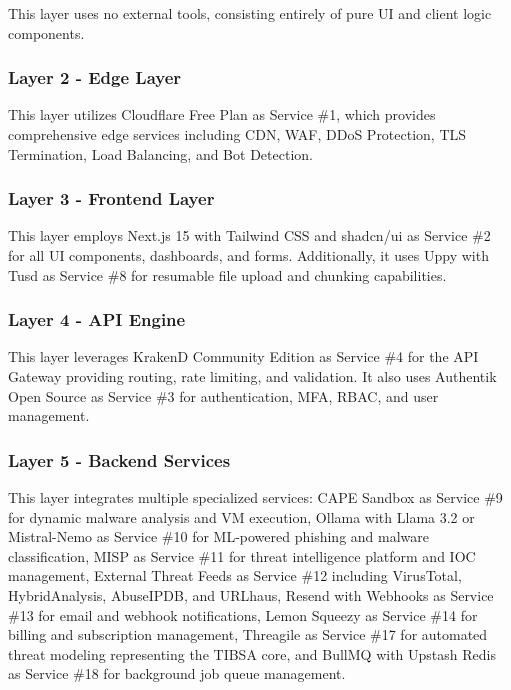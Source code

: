 \documentclass[12pt,a4paper]{report}
\begin{document}
This layer uses no external tools, consisting entirely of pure UI and client logic components.

\subsubsection{Layer 2 - Edge Layer}

This layer utilizes Cloudflare Free Plan as Service \#1, which provides comprehensive edge services including CDN, WAF, DDoS Protection, TLS Termination, Load Balancing, and Bot Detection.

\subsubsection{Layer 3 - Frontend Layer}

This layer employs Next.js 15 with Tailwind CSS and shadcn/ui as Service \#2 for all UI components, dashboards, and forms. Additionally, it uses Uppy with Tusd as Service \#8 for resumable file upload and chunking capabilities.

\subsubsection{Layer 4 - API Engine}

This layer leverages KrakenD Community Edition as Service \#4 for the API Gateway providing routing, rate limiting, and validation. It also uses Authentik Open Source as Service \#3 for authentication, MFA, RBAC, and user management.

\subsubsection{Layer 5 - Backend Services}

This layer integrates multiple specialized services: CAPE Sandbox as Service \#9 for dynamic malware analysis and VM execution, Ollama with Llama 3.2 or Mistral-Nemo as Service \#10 for ML-powered phishing and malware classification, MISP as Service \#11 for threat intelligence platform and IOC management, External Threat Feeds as Service \#12 including VirusTotal, HybridAnalysis, AbuseIPDB, and URLhaus, Resend with Webhooks as Service \#13 for email and webhook notifications, Lemon Squeezy as Service \#14 for billing and subscription management, Threagile as Service \#17 for automated threat modeling representing the TIBSA core, and BullMQ with Upstash Redis as Service \#18 for background job queue management.
\end{document}
